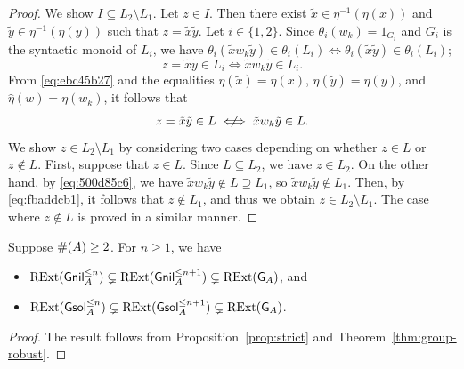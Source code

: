 \begin{proof}
  We show \(I \subseteq L_2 \setminus L_1\).
  Let \(z \in I\).
  Then there exist \(\tilde{x} \in \eta^{-1}(\eta(x))\) and \(\tilde{y} \in \eta^{-1}(\eta(y))\) such that \(z = \tilde{x} \tilde{y}\).
  Let \(i \in \{1, 2\}\).
  Since \(\theta_i(w_k) = 1_{G_i}\) and \(G_i\) is the syntactic monoid of \(L_i\),
  we have \(\theta_i(\tilde{x} w_k \tilde{y}) \in \theta_i(L_i) \iff \theta_i(\tilde{x} \tilde{y}) \in \theta_i(L_i)\);
  \ie
  \begin{equation}
    z = \tilde{x} \tilde{y} \in L_i \iff \tilde{x} w_k \tilde{y} \in L_i. \label{eq:fbaddcb1}
  \end{equation}
  From \eqref{eq:ebc45b27} and the equalities \(\eta(\tilde{x}) = \eta(x)\), \(\eta(\tilde{y}) = \eta(y)\), and \(\hat{\eta}(w) = \eta(w_k)\), it follows that
  \begin{equation}
    z = \tilde{x} \tilde{y} \in L \centernot\iff \tilde{x} w_k \tilde{y} \in L. \label{eq:500d85c6}
  \end{equation}
  We show \(z \in L_2 \setminus L_1\) by considering two cases depending on whether \(z \in L\) or \(z \notin L\).
  First, suppose that \(z \in L\).
  Since \(L \subseteq L_2\), we have \(z \in L_2\).
  On the other hand, by \eqref{eq:500d85c6}, we have \(\tilde{x} w_k \tilde{y} \notin L \supseteq L_1\), so \(\tilde{x} w_k \tilde{y} \notin L_1\).
  Then, by \eqref{eq:fbaddcb1}, it follows that \(z \notin L_1\), and thus we obtain \(z \in L_2 \setminus L_1\).
  The case where \(z \notin L\) is proved in a similar manner.
\end{proof}

\begin{corollary}\label{cor:strict-nilp-solv}
  Suppose \(\#\!\left(A\right) \geq 2\).
  For \(n \geq 1\), we have
  \begin{itemize}
    \item \(\mathrm{RExt}(\mathsf{Gnil}_A^{\leq n}) \subsetneq \mathrm{RExt}(\mathsf{Gnil}_A^{\leq n + 1}) \subsetneq \mathrm{RExt}(\mathsf{G}_A)\), and
    \item \(\mathrm{RExt}(\mathsf{Gsol}_A^{\leq n}) \subsetneq \mathrm{RExt}(\mathsf{Gsol}_A^{\leq n + 1}) \subsetneq \mathrm{RExt}(\mathsf{G}_A)\).
  \end{itemize}
\end{corollary}
\begin{proof}
  The result follows from Proposition~\ref{prop:strict} and Theorem~\ref{thm:group-robust}.
\end{proof}

